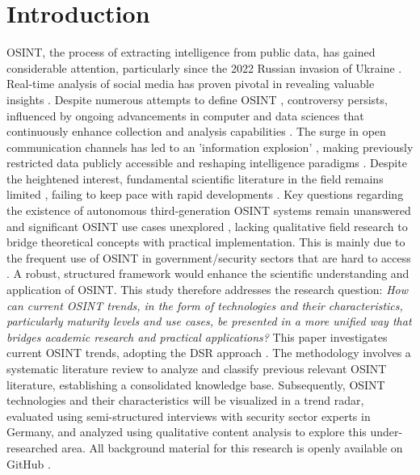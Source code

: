 \documentclass[10pt]{article}
\begin{document}
\section{Introduction} \label{sec:introduction}

OSINT, the process of extracting intelligence from public data, has gained considerable attention, particularly since
the 2022 Russian invasion of Ukraine \cite{DosPassos.2017}. Real-time analysis of social media has proven pivotal in revealing
valuable insights \cite{SmithBoyle.24.07.2023}. Despite numerous attempts to define OSINT
\cite{Hwang.2022, PastorGalindo.2020, Yogish.2021}, controversy persists, influenced by ongoing advancements in computer and
data sciences that continuously enhance collection and analysis capabilities \cite{Ghioni.2023, Williams.2018}.
The surge in open communication channels has led to an 'information explosion' \cite{DosPassos.2017, Hwang.2022, Yogish.2021},
making previously restricted data publicly accessible \cite{Hwang.2022, Williams.2018} and reshaping intelligence paradigms \cite{Dokman.2020}.
Despite the heightened interest, fundamental scientific literature in the field remains limited \cite{HerreraCubides.2020},
failing to keep pace with rapid developments \cite{Ghioni.2023, Williams.2018}. Key questions regarding the existence of
autonomous third-generation OSINT systems \cite{PastorGalindo.2019, PastorGalindo.2020} remain unanswered
\cite{Ghioni.2023, PastorGalindo.2020, Yogish.2021} and significant OSINT use cases unexplored
\cite{AlKilani.2021, Dokman.2020, Ghioni.2023}, lacking qualitative field research to bridge theoretical concepts with
practical implementation. This is mainly due to the frequent use of OSINT in government/security sectors that are hard to access \cite{HerreraCubides.2020, PastorGalindo.2019}. A robust, structured framework would enhance the scientific understanding and application of OSINT. This study therefore addresses the research question:
\textit{How can current OSINT trends, in the form of technologies and their characteristics, particularly maturity levels and use cases, be presented in a more unified way that bridges academic research and practical applications?}
This paper investigates current OSINT trends, adopting the DSR approach \cite{Peffers.2007}.
The methodology involves a systematic literature review \cite{Cleven.2009} to analyze and classify previous relevant OSINT literature, establishing a consolidated knowledge base.
Subsequently, OSINT technologies and their characteristics will be visualized in a trend radar, evaluated using semi-structured
interviews \cite{Bogner.2014, Glaser.2009} with security sector experts in Germany, and analyzed using qualitative content analysis \cite{Billings.1997} to explore this under-researched area. All background material for this research is openly available on GitHub \cite{kayser2024}.
\end{document}
